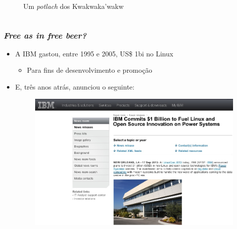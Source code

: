 \documentclass[xcolor=dvipsnames]{beamer}
\begin{document}
\begin{frame}
\begin{columns}
\begin{column}[c]{5cm}
\begin{figure}
\begin{center}
	{\small Um \textit{potlach} dos Kwakwaka'wakw}
	\vspace{0.2cm}
	\end{center}
	\end{figure}
    \end{column}
    \end{columns}
\end{frame}

\begin{frame}
	\frametitle{\textit{Free as in free beer?}}
    \begin{itemize}
      \item A IBM gastou, entre 1995 e 2005, US\$ 1bi no Linux
        \begin{itemize}
        \item Para fins de desenvolvimento e promoção
        \end{itemize}\pause
      \vspace{0.2cm}
      \item E, três anos atrás, anunciou o seguinte:
      
 	\begin{figure}
	\begin{center}
 	\includegraphics[scale=0.30]{ibm_invests.png}
	\end{center}
	\end{figure}
     
    \end{itemize}
\end{frame}
\end{document}
